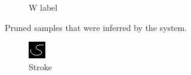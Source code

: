 \documentclass[conference]{IEEEtran}
\begin{document}
\begin{figure}[h]
\begin{subfigure}{.20\columnwidth}
        \caption{W label}
        \label{fig:inf_issue_W3}
    \end{subfigure}%
    \caption{Pruned samples that were inferred by the system.}
    \label{fig:pruned_inf_samples}
\end{figure}

\begin{figure}[h]
    \centering
    \begin{subfigure}{.20\columnwidth}
        \centering
        \includegraphics[width=.90\textwidth]{./images/issues/excluded-G-0-stroke.png}
        \caption{Stroke}
    \end{subfigure}%
    \begin{subfigure}{.20\columnwidth}
        \centering

\end{subfigure}
\end{figure}
\end{document}
